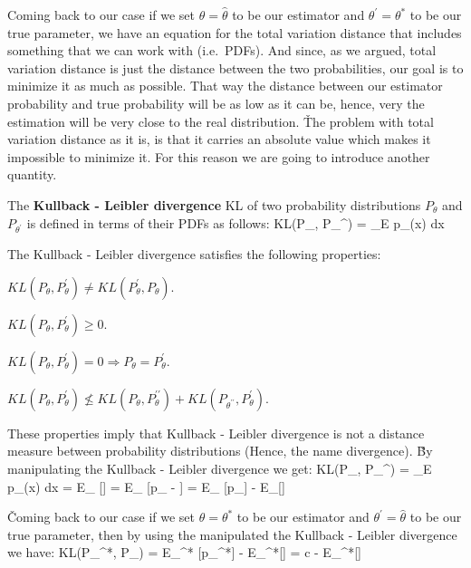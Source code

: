Coming back to our case if we set $\theta = \hat{\theta}$ to be our estimator and $\theta^{\prime} = \theta^{*}$ to
be our true parameter, we have an equation for the total variation distance that includes something that we can work
with (i.e.\ PDFs). And since, as we argued, total variation distance is just the distance between the two
probabilities, our goal is to minimize it as much as possible. That way the distance between our estimator
probability and true probability will be as low as it can be, hence, very the estimation will be very close to the
real distribution. \v

The problem with total variation distance as it is, is that it carries an absolute value which makes it impossible to
minimize it. For this reason we are going to introduce another quantity.

The \textbf{Kullback - Leibler divergence} KL of two probability distributions $P_{\theta}$ and $P_{\theta^{\prime}}$
is defined in terms of their PDFs as follows:
\bse
KL(P_{\theta}, P_{\theta}^{\prime}) = \int_{E} p_{\theta}(x) \ln {} dx
\ese
\ed

The Kullback - Leibler divergence satisfies the following properties:
\bit
\item $KL(P_{\theta}, P_{\theta}^{\prime}) \neq KL(P_{\theta}^{\prime}, P_{\theta})$.
\item $KL(P_{\theta}, P_{\theta}^{\prime}) \geq 0$.
\item $KL(P_{\theta}, P_{\theta}^{\prime}) =0 \Rightarrow P_{\theta} = P_{\theta}^{\prime}$.
\item $KL(P_{\theta}, P_{\theta}^{\prime}) \nleq KL(P_{\theta}, P_{\theta}^{\prime\prime}) +
KL(P_{\theta^{\prime\prime}}, P_{\theta}^{\prime})$.
\eit

These properties imply that Kullback - Leibler divergence is not a distance measure between probability distributions
(Hence, the name divergence). \v

By manipulating the Kullback - Leibler divergence we get:
\bse
KL(P_{\theta}, P_{\theta}^{\prime}) = \int_{E} p_{\theta}(x) \ln {} dx =
E_{\theta} [\ln {}] = E_{\theta} [\ln p_{\theta} - ] =
E_{\theta} [\ln p_{\theta}] - E_{\theta}[]
\ese

\v

Coming back to our case if we set $\theta = \theta^{*}$ to be our estimator and $\theta^{\prime} = \hat{\theta}$ to
be our true parameter, then by using the manipulated the Kullback - Leibler divergence we have:
\bse
KL(P_{\theta^{*}}, P_{\hat{\theta}}) = E_{\theta^{*}} [\ln p_{\theta^{*}}] - E_{\theta^{*}}[] =
c - E_{\theta^{*}}[]
\ese

